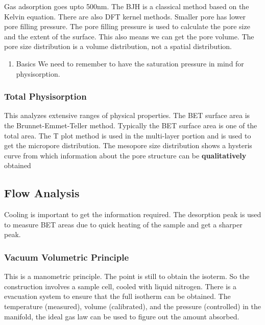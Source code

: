 \documentclass[12pt,a4paper,oneside,headinclude]{scrartcl}
\numberwithin{figure}{section}
\numberwithin{equation}{section}
\numberwithin{table}{section}
\begin{document}
Gas adsorption goes upto 500nm. The BJH is a classical method based on the
Kelvin equation. There are also DFT kernel methods.
Smaller pore has lower pore filling pressure. The pore filling pressure is used
to calculate the pore size and the extent of the surface. This also means we can
get the pore volume. The pore size distribution is a volume distribution, not a
spatial distribution.
\begin{enumerate}
\item Basics
\label{sec:org643c0a2}
We need to remember to have the saturation pressure in mind for physisorption.
\end{enumerate}
\subsubsection{Total Physisorption}
\label{sec:org41e7d2b}
This analyzes extensive ranges of physical properties. The BET surface area is
the Brunnet-Emmet-Teller method. Typically the BET surface area is one of the
total area. The T plot method is used in the multi-layer portion and is used to
get the micropore distribution. The mesopore size distribution shows a hysteris
curve from which information about the pore structure can be \textbf{qualitatively} obtained

\subsection{Flow Analysis}
\label{sec:org6a7eba9}
Cooling is important to get the information required. The desorption peak is
used to measure BET areas due to quick heating of the sample and get a sharper peak.
\subsubsection{Vacuum Volumetric Principle}
\label{sec:org79bb070}
This is a manometric principle. The point is still to obtain the isoterm. So the
construction involves a sample cell, cooled with liquid nitrogen. There is a
evacuation system to ensure that the full isotherm can be obtained. The
temperature (measured), volume (calibrated), and the pressure (controlled) in the manifold, the ideal
gas law can be used to figure out the amount absorbed.
\end{document}
